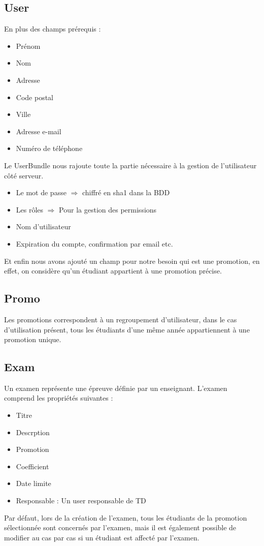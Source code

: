 \documentclass{report}
\begin{document}
    \subsection{User}
      En plus des champs prérequis :
      \begin{itemize}
        \item{Prénom}
        \item{Nom}
        \item{Adresse}
        \item{Code postal}
        \item{Ville}
        \item{Adresse e-mail}
        \item{Numéro de téléphone}
      \end{itemize}

      Le UserBundle nous rajoute toute la partie nécessaire à la gestion de
      l'utilisateur côté serveur.
      \begin{itemize}
        \item{Le mot de passe $\Rightarrow$ chiffré en sha1 dans la BDD}
        \item{Les rôles $\Rightarrow$ Pour la gestion des permissions}
        \item{Nom d'utilisateur}
        \item{Expiration du compte, confirmation par email etc.}
      \end{itemize}

      Et enfin nous avons ajouté un champ pour notre besoin qui est une
      promotion, en effet, on considère qu'un étudiant appartient à une
      promotion précise.

    \subsection{Promo}
      Les promotions correspondent à un regroupement d'utilisateur, dans le cas d'utilisation présent, tous les étudiants d'une même année 
      appartiennent à une promotion unique.

    \subsection{Exam}
      Un examen représente une épreuve définie par un enseignant. L'examen 
			comprend les propriétés suivantes :
			\begin{itemize}
				\item{Titre}
				\item{Descrption}
				\item{Promotion}
				\item{Coefficient}
				\item{Date limite}
				\item{Responsable : Un user responsable de TD}
			\end{itemize}
			Par défaut, lors de la création de l'examen, tous les étudiants de la promotion sélectionnée sont concernés par l'examen, mais il est également possible de modifier au cas par cas si un étudiant est affecté par l'examen.
\end{document}
